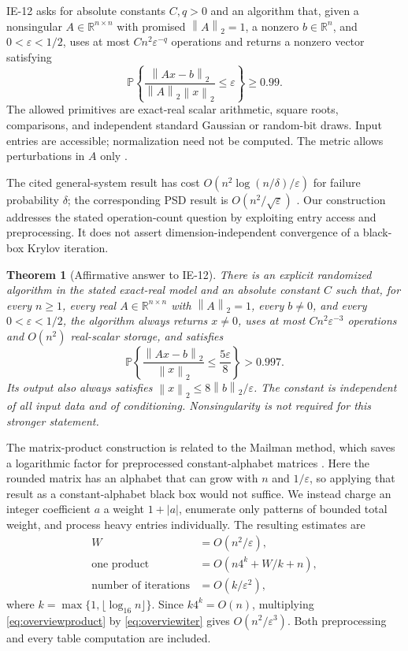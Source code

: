 \documentclass[11pt,a4paper]{article}
\newtheorem{theorem}{Theorem}
\theoremstyle{remark}
\newcommand{\R}{\mathbb R}
\newcommand{\PP}{\mathbb P}
\newcommand{\eps}{\varepsilon}
\newcommand{\norm}[1]{\left\|#1\right\|_2}
\begin{document}
IE-12 asks for absolute constants $C,q>0$ and an algorithm that, given a
nonsingular $A\in\R^{n\times n}$ with promised $\norm{A}=1$, a nonzero
$b\in\R^n$, and $0<\eps<1/2$, uses at most $Cn^2\eps^{-q}$ operations and
returns a nonzero vector satisfying
\begin{equation}\label{eq:target}
 \PP\!\left\{\frac{\norm{Ax-b}}{\norm{A}\norm{x}}\le\eps\right\}\ge0.99.
\end{equation}
The allowed primitives are exact-real scalar arithmetic, square roots,
comparisons, and independent standard Gaussian or random-bit draws. Input
entries are accessible; normalization need not be computed. The metric allows
perturbations in $A$ only \cite{ie12}.

The cited general-system result has cost
$O(n^2\log(n/\delta)/\eps)$ for failure probability $\delta$; the corresponding
PSD result is $O(n^2/\sqrt\eps)$ \cite[Corollaries 17 and 25]{dnr}.
Our construction addresses the stated operation-count question by exploiting
entry access and preprocessing. It does not assert dimension-independent
convergence of a black-box Krylov iteration.

\begin{theorem}[Affirmative answer to IE-12]\label{thm:main}
There is an explicit randomized algorithm in the stated exact-real model and
an absolute constant $C$ such that, for every $n\ge1$, every real
$A\in\R^{n\times n}$ with $\norm{A}=1$, every $b\ne0$, and every
$0<\eps<1/2$, the algorithm always returns $x\ne0$, uses at most
$Cn^2\eps^{-3}$ operations and $O(n^2)$ real-scalar storage, and satisfies
\begin{equation}\label{eq:main}
 \PP\!\left\{\frac{\norm{Ax-b}}{\norm{x}}\le\frac{5\eps}{8}\right\}>0.997.
\end{equation}
Its output also always satisfies $\norm{x}\le8\norm{b}/\eps$.
The constant is independent of all input data and of conditioning.
Nonsingularity is not required for this stronger statement.
\end{theorem}

The matrix-product construction is related to the Mailman method, which saves
a logarithmic factor for preprocessed constant-alphabet matrices
\cite{mailman}. Here the rounded matrix has an alphabet that can grow with
$n$ and $1/\eps$, so applying that result as a constant-alphabet black box
would not suffice. We instead charge an integer coefficient $a$ a weight
$1+|a|$, enumerate only patterns of bounded total weight, and process heavy
entries individually. The resulting estimates are
\begin{align}
 W&=O(n^2/\eps),\label{eq:overviewW}\\
 \text{one product}&=O(n4^k+W/k+n),\label{eq:overviewproduct}\\
 \text{number of iterations}&=O(k/\eps^2),\label{eq:overviewiter}
\end{align}
where $k=\max\{1,\lfloor\log_{16}n\rfloor\}$. Since $k4^k=O(n)$,
multiplying \eqref{eq:overviewproduct} by \eqref{eq:overviewiter} gives
$O(n^2/\eps^3)$. Both preprocessing and every table computation are included.
\end{document}

